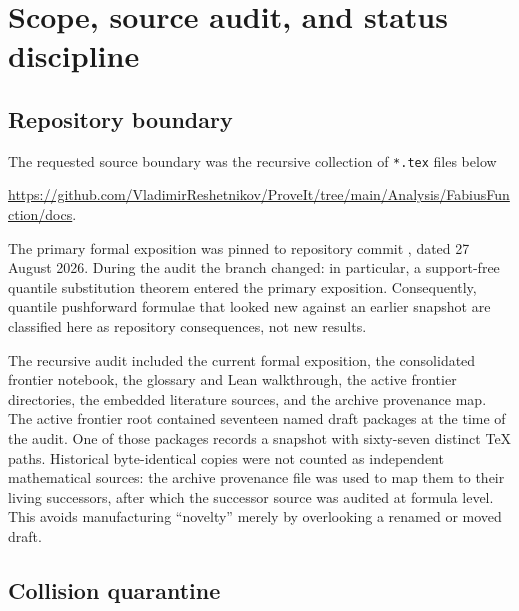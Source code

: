 \documentclass[11pt]{article}
\theoremstyle{definition}
\theoremstyle{remark}
\begin{document}
\section{Scope, source audit, and status discipline}
\label{p2:sec:audit}

\subsection{Repository boundary}

The requested source boundary was the recursive collection of \texttt{*.tex} files below
\begin{center}
\small
\url{https://github.com/VladimirReshetnikov/ProveIt/tree/main/Analysis/FabiusFunction/docs}.
\end{center}
The primary formal exposition was pinned to repository commit
\CommitID, dated 27 August 2026.  During the audit the
branch changed: in particular, a support-free quantile substitution theorem entered the
primary exposition.  Consequently, quantile pushforward formulae that looked new against an
earlier snapshot are classified here as repository consequences, not new results.

The recursive audit included the current formal exposition, the consolidated frontier
notebook, the glossary and Lean walkthrough, the active frontier directories, the embedded
literature sources, and the archive provenance map.  The active frontier root contained
seventeen named draft packages at the time of the audit.  One of those packages records a
snapshot with sixty-seven distinct TeX paths.  Historical byte-identical copies were not
counted as independent mathematical sources: the archive provenance file was used to map
them to their living successors, after which the successor source was audited at formula
level.  This avoids manufacturing ``novelty'' merely by overlooking a renamed or moved draft.

\subsection{Collision quarantine}
\end{document}
